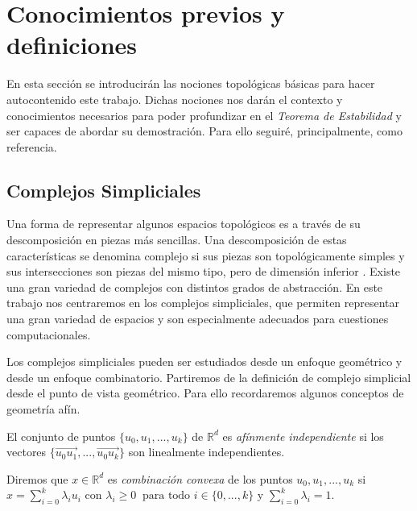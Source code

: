 
\section{Conocimientos previos y definiciones}\label{sec:bg}
En esta sección se introducirán las nociones topológicas básicas para hacer autocontenido este trabajo. Dichas nociones nos darán el contexto y conocimientos necesarios para poder profundizar en el \emph{Teorema de Estabilidad} y ser capaces de abordar su demostración. Para ello seguiré, principalmente, \cite{libroEH, Hatcher, articuloPersistenciaEH, Cohen-Steiner2007} como referencia.

\subsection{Complejos Simpliciales}

Una forma de representar algunos espacios topológicos es a través de su descomposición en piezas más sencillas. Una descomposición de estas características se denomina complejo si sus piezas son topológicamente simples y sus intersecciones son piezas del mismo tipo, pero de dimensión inferior \cite{libroEH}. Existe una gran variedad de complejos con distintos grados de abstracción. En este trabajo nos centraremos en los complejos simpliciales, que permiten representar una gran variedad de espacios y son especialmente adecuados para cuestiones computacionales.

Los complejos simpliciales pueden ser estudiados desde un enfoque geométrico y desde un enfoque combinatorio. Partiremos de la definición de complejo simplicial desde el punto de vista geométrico. Para ello recordaremos algunos conceptos de geometría afín.

\begin{definition}
El conjunto de puntos $\{u_0, u_1, ..., u_k\}$ de $\mathbb{R}^d$ es \emph{afínmente independiente} si los vectores $\{\overrightarrow{u_0u_1}, ..., \overrightarrow{u_0u_k}\}$ son linealmente independientes.
\end{definition}

\begin{definition}
\begin{sloppypar}
Diremos que $x \in \mathbb{R}^d$ es \emph{combinación convexa} de los puntos ${u_0, u_1, ..., u_k}$ si $x = \sum_{i=0}^{k} \lambda_i u_i$ con $\lambda_i \geq 0 \ \text{ para todo } i \in \{0,...,k\}$ y $\sum_{i=0}^{k} \lambda_i = 1$.
\end{sloppypar}
\end{definition}

